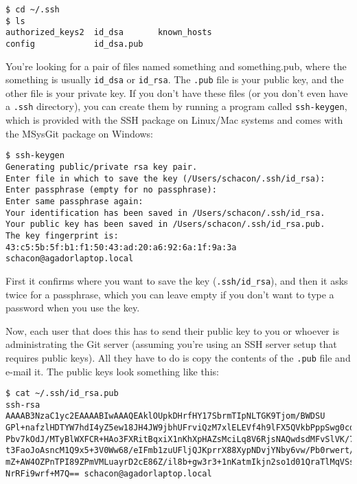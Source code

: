 \documentclass[a4paper]{book}
\begin{document}
\begin{shaded}\begin{verbatim}
$ cd ~/.ssh
$ ls
authorized_keys2  id_dsa       known_hosts
config            id_dsa.pub
\end{verbatim}\end{shaded}

You're looking for a pair of files named something and something.pub, where the something is usually \texttt{id\_dsa} or \texttt{id\_rsa}. The \texttt{.pub} file is your public key, and the other file is your private key. If you don't have these files (or you don't even have a \texttt{.ssh} directory), you can create them by running a program called \texttt{ssh-keygen}, which is provided with the SSH package on Linux/Mac systems and comes with the MSysGit package on Windows:

\begin{shaded}\begin{verbatim}
$ ssh-keygen
Generating public/private rsa key pair.
Enter file in which to save the key (/Users/schacon/.ssh/id_rsa):
Enter passphrase (empty for no passphrase):
Enter same passphrase again:
Your identification has been saved in /Users/schacon/.ssh/id_rsa.
Your public key has been saved in /Users/schacon/.ssh/id_rsa.pub.
The key fingerprint is:
43:c5:5b:5f:b1:f1:50:43:ad:20:a6:92:6a:1f:9a:3a schacon@agadorlaptop.local
\end{verbatim}\end{shaded}

First it confirms where you want to save the key (\texttt{.ssh/id\_rsa}), and then it asks twice for a passphrase, which you can leave empty if you don't want to type a password when you use the key.

Now, each user that does this has to send their public key to you or whoever is administrating the Git server (assuming you're using an SSH server setup that requires public keys). All they have to do is copy the contents of the \texttt{.pub} file and e-mail it. The public keys look something like this:

\begin{shaded}\begin{verbatim}
$ cat ~/.ssh/id_rsa.pub
ssh-rsa AAAAB3NzaC1yc2EAAAABIwAAAQEAklOUpkDHrfHY17SbrmTIpNLTGK9Tjom/BWDSU
GPl+nafzlHDTYW7hdI4yZ5ew18JH4JW9jbhUFrviQzM7xlELEVf4h9lFX5QVkbPppSwg0cda3
Pbv7kOdJ/MTyBlWXFCR+HAo3FXRitBqxiX1nKhXpHAZsMciLq8V6RjsNAQwdsdMFvSlVK/7XA
t3FaoJoAsncM1Q9x5+3V0Ww68/eIFmb1zuUFljQJKprrX88XypNDvjYNby6vw/Pb0rwert/En
mZ+AW4OZPnTPI89ZPmVMLuayrD2cE86Z/il8b+gw3r3+1nKatmIkjn2so1d01QraTlMqVSsbx
NrRFi9wrf+M7Q== schacon@agadorlaptop.local
\end{verbatim}\end{shaded}
\end{document}
